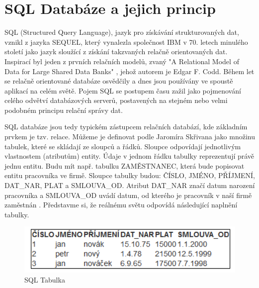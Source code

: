 \chapter{SQL Databáze a jejich princip}
SQL (Structured Query Language), jazyk pro získávání strukturovaných dat, vznikl z jazyka SEQUEL, který vynalezla společnost IBM v 70. letech minulého století jako jazyk sloužící z získání takzvaných relačně orientovaných dat. Inspirací byl jeden z prvních relačních modelů, zvaný "A Relational Model of Data for Large Shared Data Banks" \cite{coddSql}, jehož autorem je Edgar F. Codd.  Během let se relačně orientované databáze osvědčily a dnes jsou používány ve spoustě aplikací na celém světě. Pojem SQL se postupem času zažil jako pojmenování celého odvětví databázových serverů, postavených na stejném nebo velmi podobném principu relační správy dat.

SQL databáze jsou tedy typickém zástupcem relačních databází, kde základním prvkem je tzv. relace. Můžeme je definovat podle Jaromíra Skřivana jako množinu tabulek, které se skládají ze sloupců a řádků. Sloupce odpovídají jednotlivým vlastnostem (atributům) entity. Údaje v jednom řádku tabulky reprezentují právě jednu entitu.
Budu mít např. tabulku ZAMĚSTNANEC, která bude popisovat entitu pracovníka ve firmě. Sloupce tabulky budou: ČÍSLO, JMÉNO, PŘÍJMENÍ, DAT\_NAR, PLAT a SMLOUVA\_OD. Atribut DAT\_NAR značí datum narození pracovníka a SMLOUVA\_OD uvádí datum, od kterého je pracovník v naší firmě zaměstnán \cite{sqlDatabaze}. Představme si, že reálnému světu odpovídá následující naplnění tabulky.

\begin{figure}[h]
\begin{centering}
\includegraphics[scale=1]{obrazky/sql-tabulka}
\par\end{centering}
\caption{SQL Tabulka \cite{sqlDatabaze} \label{fig:sqlTable}}
\end{figure}



